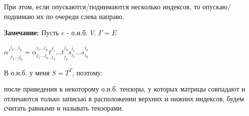 При этом, если опускаются/поднимаются несколько индексов, то опускаю/поднимаю их по очереди слева направо.


\textbf{Замечание:} Пусть $e$ - о.н.б. $V$. $\Gamma =E$

$\alpha'^{\overline{i}_1\ldots \overline{i}_q}_{\overline{j}_1 \ldots \overline{j}_p} = \alpha^{i_1 \ldots i_q}_{j_1\ldots j_p} t_{\overline{j}_1}^{j_1}\ldots t_{\overline{j}_p}^{j_p}s_{i_1}^{\overline{i}_1}\ldots s_{i_q}^{\overline{i}_q} $





 В о.н.б.  у меня $S = T^T$, поэтому:

после приведения к некоторому о.н.б. тензоры, у которых матрицы совпадают и отличаются только записью в расположении верхних и нижних индексов, будем считать равными и называть  тензорами.

